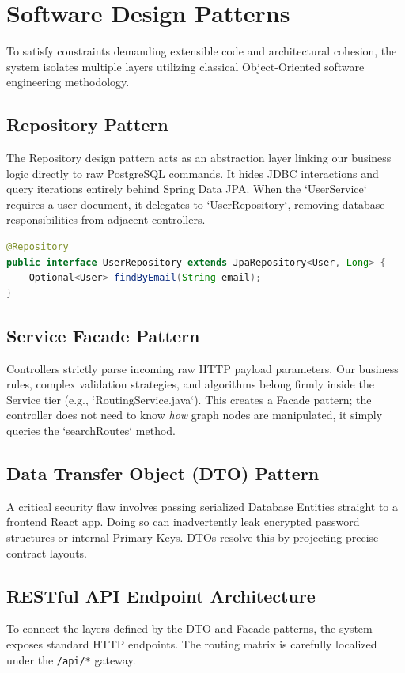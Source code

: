 \documentclass[12pt,a4paper]{article}
\begin{document}
\newpage

\section{Software Design Patterns}

To satisfy constraints demanding extensible code and architectural cohesion, the system isolates multiple layers utilizing classical Object-Oriented software engineering methodology.

\subsection{Repository Pattern}
The Repository design pattern acts as an abstraction layer linking our business logic directly to raw PostgreSQL commands. It hides JDBC interactions and query iterations entirely behind Spring Data JPA. When the `UserService` requires a user document, it delegates to `UserRepository`, removing database responsibilities from adjacent controllers.

\begin{lstlisting}[language=Java, caption=Abstracted User Repository via JPA]
@Repository
public interface UserRepository extends JpaRepository<User, Long> {
    Optional<User> findByEmail(String email);
}
\end{lstlisting}

\subsection{Service Facade Pattern}
Controllers strictly parse incoming raw HTTP payload parameters. Our business rules, complex validation strategies, and algorithms belong firmly inside the Service tier (e.g., `RoutingService.java`). This creates a Facade pattern; the controller does not need to know \textit{how} graph nodes are manipulated, it simply queries the `searchRoutes` method.

\subsection{Data Transfer Object (DTO) Pattern}
A critical security flaw involves passing serialized Database Entities straight to a frontend React app. Doing so can inadvertently leak encrypted password structures or internal Primary Keys. DTOs resolve this by projecting precise contract layouts.

\subsection{RESTful API Endpoint Architecture}
To connect the layers defined by the DTO and Facade patterns, the system exposes standard HTTP endpoints. The routing matrix is carefully localized under the \texttt{/api/*} gateway.
\end{document}
